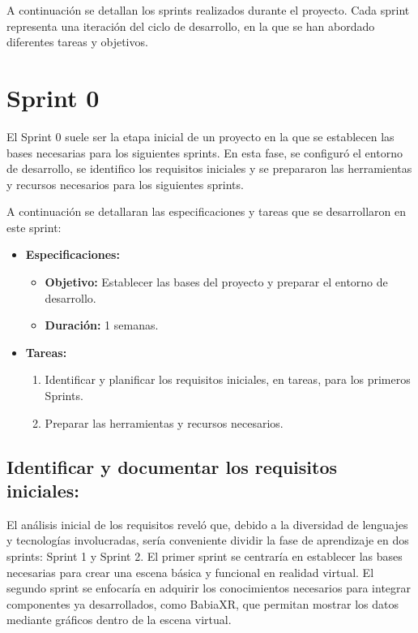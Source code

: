 \documentclass[a4paper, 12pt]{book}
\begin{document}
A continuación se detallan los sprints realizados durante el proyecto. Cada sprint representa una iteración del ciclo de desarrollo, en la que se han abordado diferentes tareas y objetivos.

\section{Sprint 0}
El Sprint 0 suele ser la etapa inicial de un proyecto en la que se establecen las bases necesarias para los siguientes sprints. En esta fase, se configuró el entorno de desarrollo, se identifico los requisitos iniciales y se prepararon las herramientas y recursos necesarios para los siguientes sprints.

A continuación se detallaran las especificaciones y tareas que se desarrollaron en este sprint:

        \begin{itemize}
            \item \textbf{Especificaciones:}
            \begin{itemize}
                \item \textbf{Objetivo:} Establecer las bases del proyecto y preparar el entorno de desarrollo.
                \item \textbf{Duración:} 1 semanas.
            \end{itemize}
            
            \item \textbf{Tareas:}
            \begin{enumerate}
                \item Identificar y planificar los requisitos iniciales, en tareas, para los primeros Sprints.
                \item Preparar las herramientas y recursos necesarios.
            \end{enumerate}
        \end{itemize}

    \subsection{Identificar y documentar los requisitos iniciales:}

    El análisis inicial de los requisitos reveló que, debido a la diversidad de lenguajes y tecnologías involucradas, sería conveniente dividir la fase de aprendizaje en dos sprints: Sprint 1 y Sprint 2. El primer sprint se centraría en establecer las bases necesarias para crear una escena básica y funcional en realidad virtual. El segundo sprint se enfocaría en adquirir los conocimientos necesarios para integrar componentes ya desarrollados, como BabiaXR, que permitan mostrar los datos mediante gráficos dentro de la escena virtual.
\end{document}
